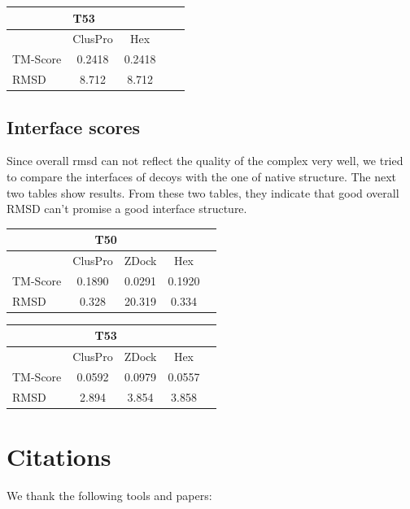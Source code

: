 \documentclass{article}
\begin{document}
\begin{center}
\begin{tabular}{|l|c|c|c|r|}
\multicolumn{3}{c}{T53} \\
    \hline
      & ClusPro & Hex \\ \hline
    TM-Score & 0.2418 & 0.2418 \\ \hline
    RMSD & 8.712 & 8.712 \\
    \hline
    \end{tabular}
\end{center}




\subsection{Interface scores}

Since overall rmsd can not reflect the quality of the complex very well, we tried to compare the interfaces of decoys with the one of native structure. The next two tables show results. From these two tables, they indicate that good overall RMSD can’t promise a good interface structure.


\begin{center}
\begin{tabular}{|l|c|c|c|r|}
\multicolumn{4}{c}{T50} \\
    \hline
      & ClusPro & ZDock & Hex \\ \hline
    TM-Score & 0.1890 & 0.0291 & 0.1920 \\ \hline
    RMSD & 0.328 & 20.319 & 0.334 \\
    \hline
    \end{tabular}
\end{center}


\begin{center}
\begin{tabular}{|l|c|c|c|r|}
\multicolumn{4}{c}{T53} \\
    \hline
      & ClusPro & ZDock & Hex \\ \hline
    TM-Score & 0.0592 & 0.0979 & 0.0557 \\ \hline
    RMSD & 2.894 & 3.854 & 3.858 \\
    \hline
    \end{tabular}
\end{center}





\section{Citations}

We thank the following tools and papers: \\\\
\end{document}
